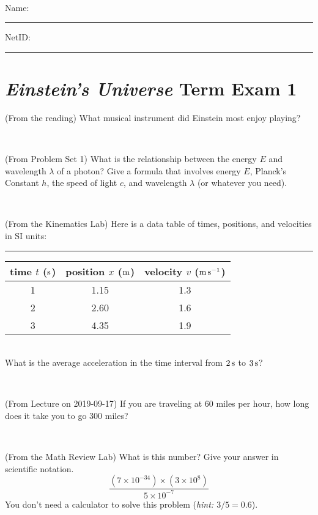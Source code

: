 \documentclass[12pt, letterpaper]{article}
\begin{document}
\vfill ~


\cleardoublepage



\noindent
Name: \rule[-1ex]{0.60\textwidth}{0.1pt}
NetID: \rule[-1ex]{0.20\textwidth}{0.1pt}

\section*{\textsl{Einstein's Universe} Term Exam 1}
\setcounter{problem}{1}


\begin{problem} (From the reading)
What musical instrument did Einstein most enjoy playing?
\end{problem}


\vfill ~

\begin{problem} (From Problem Set 1)
What is the relationship between the energy $E$ and wavelength
$\lambda$ of a photon? Give a formula that involves energy $E$,
Planck's Constant $h$, the speed of light $c$, and wavelength
$\lambda$ (or whatever you need).
\end{problem}

\vfill ~

\begin{problem} (From the Kinematics Lab)
Here is a data table of times, positions, and velocities in SI units:\\
\rule{1.0in}{0pt}\begin{tabular}{c|c|c}
time $t$ ($\mathrm{s}$) & position $x$ ($\mathrm{m}$) & velocity $v$ ($\mathrm{m}\,\mathrm{s}^{-1}$) \\
\hline
1 & 1.15 & 1.3 \\
2 & 2.60 & 1.6 \\
3 & 4.35 & 1.9 \\
\hline
\end{tabular}\\
What is the average acceleration in the time interval from $2\,\mathrm{s}$ to $3\,\mathrm{s}$?
\end{problem}


\vfill ~

\begin{problem} (From Lecture on 2019-09-17)
If you are traveling at 60 miles per hour, how long does
it take you to go 300 miles?
\end{problem}


\vfill ~


\clearpage


\begin{problem} (From the Math Review Lab)
What is this number? Give your answer in scientific notation.
$$
\frac{(7\times10^{-34})\times(3\times10^8)}{5\times10^{-7}}
$$
You don't need a calculator to solve this problem (\textit{hint: $3/5=0.6$}).
\end{problem}
\end{document}
